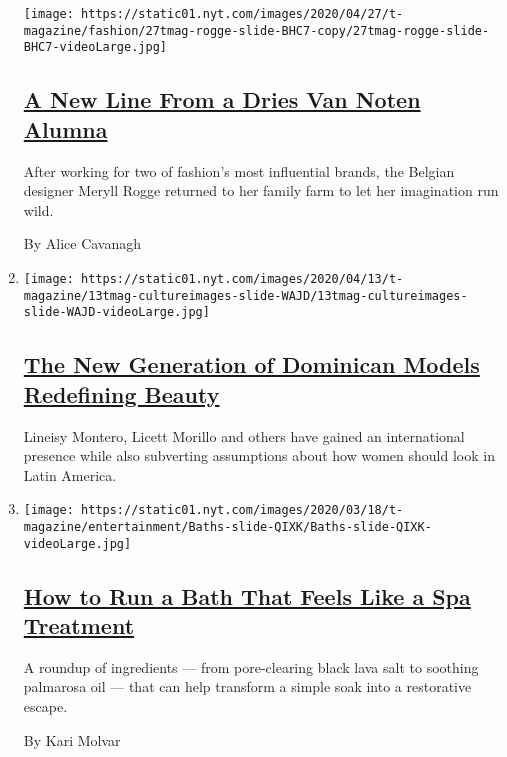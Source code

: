 \begin{enumerate}
  \texttt{[image: https://static01.nyt.com/images/2020/04/27/t-magazine/fashion/27tmag-rogge-slide-BHC7-copy/27tmag-rogge-slide-BHC7-videoLarge.jpg]}

  \hypertarget{a-new-line-from-a-dries-van-noten-alumna}{%
  \subsection{\texorpdfstring{\href{/2020/05/04/t-magazine/meryll-rogge.html}{A
  New Line From a Dries Van Noten
  Alumna}}{A New Line From a Dries Van Noten Alumna}}\label{a-new-line-from-a-dries-van-noten-alumna}}

  After working for two of fashion's most influential brands, the
  Belgian designer Meryll Rogge returned to her family farm to let her
  imagination run wild.

  By Alice Cavanagh
\item
  \texttt{[image: https://static01.nyt.com/images/2020/04/13/t-magazine/13tmag-cultureimages-slide-WAJD/13tmag-cultureimages-slide-WAJD-videoLarge.jpg]}

  \hypertarget{the-new-generation-of-dominican-models-redefining-beauty}{%
  \subsection{\texorpdfstring{\href{/interactive/2020/04/13/t-magazine/dominican-republic-models.html}{The
  New Generation of Dominican Models Redefining
  Beauty}}{The New Generation of Dominican Models Redefining Beauty}}\label{the-new-generation-of-dominican-models-redefining-beauty}}

  Lineisy Montero, Licett Morillo and others have gained an
  international presence while also subverting assumptions about how
  women should look in Latin America.
\item
  \texttt{[image: https://static01.nyt.com/images/2020/03/18/t-magazine/entertainment/Baths-slide-QIXK/Baths-slide-QIXK-videoLarge.jpg]}

  \hypertarget{how-to-run-a-bath-that-feels-like-a-spa-treatment}{%
  \subsection{\texorpdfstring{\href{/2020/03/20/t-magazine/best-bath-products.html}{How
  to Run a Bath That Feels Like a Spa
  Treatment}}{How to Run a Bath That Feels Like a Spa Treatment}}\label{how-to-run-a-bath-that-feels-like-a-spa-treatment}}

  A roundup of ingredients --- from pore-clearing black lava salt to
  soothing palmarosa oil --- that can help transform a simple soak into
  a restorative escape.

  By Kari Molvar
\end{enumerate}


